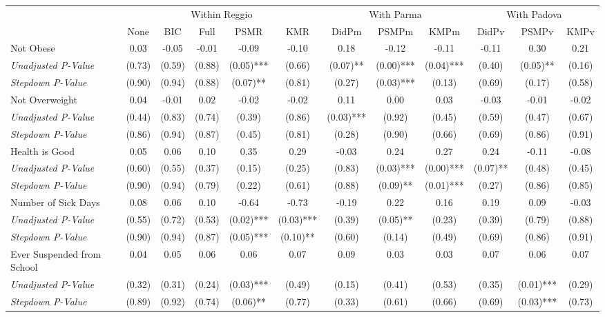 \begin{tabular}{l c c c c c c c c c c c}
\toprule
& \multicolumn{5}{c}{Within Reggio} & \multicolumn{3}{c}{With Parma} & \multicolumn{3}{c}{With Padova} \\\cmidrule(lr){2-6} \cmidrule(lr){7-9} \cmidrule(lr){10-12}
 & None & BIC & Full & PSMR & KMR & DidPm & PSMPm & KMPm & DidPv & PSMPv & KMPv \\
\midrule
Not Obese & 0.03 & -0.05 & -0.01 & -0.09 & -0.10 & 0.18 & -0.12 & -0.11 & -0.11 & 0.30 & 0.21 \\
\quad \textit{Unadjusted P-Value} & (0.73) & (0.59) & (0.88) & (0.05)*** & (0.66) & (0.07)** & (0.00)*** & (0.04)*** & (0.40) & (0.05)** & (0.16) \\
\quad \textit{Stepdown P-Value} & (0.90) & (0.94) & (0.88) & (0.07)** & (0.81) & (0.27) & (0.03)*** & (0.13) & (0.69) & (0.17) & (0.58) \\
Not Overweight & 0.04 & -0.01 & 0.02 & -0.02 & -0.02 & 0.11 & 0.00 & 0.03 & -0.03 & -0.01 & -0.02 \\
\quad \textit{Unadjusted P-Value} & (0.44) & (0.83) & (0.74) & (0.39) & (0.86) & (0.03)*** & (0.92) & (0.45) & (0.59) & (0.47) & (0.67) \\
\quad \textit{Stepdown P-Value} & (0.86) & (0.94) & (0.87) & (0.45) & (0.81) & (0.28) & (0.90) & (0.66) & (0.69) & (0.86) & (0.91) \\
Health is Good & 0.05 & 0.06 & 0.10 & 0.35 & 0.29 & -0.03 & 0.24 & 0.27 & 0.24 & -0.11 & -0.08 \\
\quad \textit{Unadjusted P-Value} & (0.60) & (0.55) & (0.37) & (0.15) & (0.25) & (0.83) & (0.03)*** & (0.00)*** & (0.07)** & (0.48) & (0.45) \\
\quad \textit{Stepdown P-Value} & (0.90) & (0.94) & (0.79) & (0.22) & (0.61) & (0.88) & (0.09)** & (0.01)*** & (0.27) & (0.86) & (0.85) \\
Number of Sick Days & 0.08 & 0.06 & 0.10 & -0.64 & -0.73 & -0.19 & 0.22 & 0.16 & 0.19 & 0.09 & -0.03 \\
\quad \textit{Unadjusted P-Value} & (0.55) & (0.72) & (0.53) & (0.02)*** & (0.03)*** & (0.39) & (0.05)** & (0.23) & (0.39) & (0.79) & (0.88) \\
\quad \textit{Stepdown P-Value} & (0.90) & (0.94) & (0.87) & (0.05)*** & (0.10)** & (0.60) & (0.14) & (0.49) & (0.69) & (0.86) & (0.91) \\
Ever Suspended from School & 0.04 & 0.05 & 0.06 & 0.06 & 0.07 & 0.09 & 0.03 & 0.03 & 0.07 & 0.06 & 0.07 \\
\quad \textit{Unadjusted P-Value} & (0.32) & (0.31) & (0.24) & (0.03)*** & (0.49) & (0.15) & (0.41) & (0.53) & (0.35) & (0.01)*** & (0.29) \\
\quad \textit{Stepdown P-Value} & (0.89) & (0.92) & (0.74) & (0.06)** & (0.77) & (0.33) & (0.61) & (0.66) & (0.69) & (0.03)*** & (0.73) \\
\bottomrule
\end{tabular}
